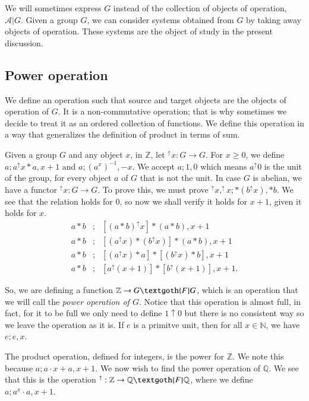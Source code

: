\documentclass [12pt]{book}
\begin{document}
We will sometimes express $G$ instead of the collection of objects of operation, $\mathcal{A}|G$. Given a group $G$, we can consider systems obtained from $G$ by taking away objects of operation. These systems are the object of study in the present discussion.

			\subsection{Power operation}

We define an operation such that source and target objects are the objects of operation of $G$. It is a non-commutative operation; that is why sometimes we decide to treat it as an ordered collection of functions. We define this operation in a way that generalizes the definition of product in terms of sum.

Given a group $G$ and any object $x$, in $\mathbb{Z}$, let $^{\uparrow} x:G\rightarrow G$. For $x\geq0$, we define $a;a^{\uparrow}x*a,x+1$ and $a;(a^{x})^{-1},-x$. We accept $a;1,0$ which means $a^{\uparrow}0$ is the unit of the group, for every object $a$ of $G$ that is not the unit. In case $G$ is abelian, we have a functor $^{\uparrow}x:G\rightarrow G$. To prove this, we must prove $^{\uparrow}x,^{\uparrow}x;*(b^{\uparrow}x),*b$. We see that the relation holds for 0, so now we shall verify it holds for $x+1$, given it holds for $x$. \begin{eqnarray}\nonumber a*b&;&[(a*b)^{\uparrow}x]*(a*b),x+1\\\nonumber a*b&;&[(a^{\uparrow}x)*(b^{\uparrow}x)]*(a*b),x+1\\\nonumber a*b&;&
[(a^{\uparrow}x)*a]*[(b^{\uparrow}x)*b],x+1\\\nonumber a*b&;&
[a^{\uparrow}(x+1)]*[b^{\uparrow}(x+1)],x+1.\end{eqnarray}

So, we are defining a function $\mathbb{Z}\rightarrow G\textgoth{F}G$, which is an operation that we will call the \textit{power operation of $G$}. Notice that this operation is almost full, in fact, for it to be full we only need to define $1\uparrow0$ but there is no consistent way so we leave the operation as it is. If $e$ is a primitve unit, then for all $x\in\mathbb{N}$, we have $e;e,x$.

The product operation, defined for integers, is the power for $\mathbb{Z}$. We note this because $a;a\cdot x+a,x+1$. We now wish to find the power operation of $\mathbb{Q}$. We see that this is the operation $^{\uparrow}:\mathbb{Z}\rightarrow\mathbb{Q}\textgoth{F}\mathbb{Q}$, where we define $a;a^{x} \cdot a,x+1$.
\end{document}
